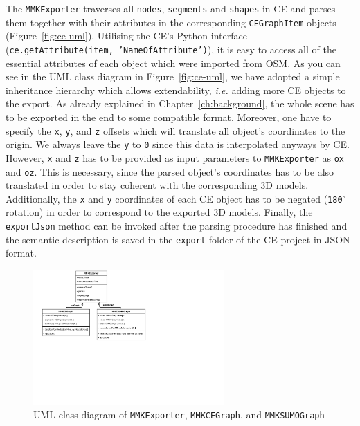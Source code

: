 The \texttt{MMKExporter} traverses all \texttt{nodes}, \texttt{segments} and \texttt{shapes} in CE and parses them together with their attributes in the corresponding \texttt{CEGraphItem} objects (Figure~\ref{fig:ce-uml}). Utilising the CE's Python interface (\texttt{ce.getAttribute(item, 'NameOfAttribute')}), it is easy to access all of the essential attributes of each object which were imported from OSM. As you can see in the UML class diagram in Figure~\ref{fig:ce-uml}, we have adopted a simple inheritance hierarchy which allows extendability, \emph{i.e.} adding more CE objects to the export. As already explained in Chapter~\ref{ch:background}, the whole scene has to be exported in the end to some compatible format. Moreover, one have to specify the \texttt{x}, \texttt{y}, and \texttt{z} offsets which will translate all object's coordinates to the origin. We always leave the \texttt{y} to \texttt{0} since this data is interpolated anyways by CE. However, \texttt{x} and \texttt{z} has to be provided as input parameters to \texttt{MMKExporter} as \texttt{ox} and \texttt{oz}. This is necessary, since the parsed object's coordinates has to be also translated in order to stay coherent with the corresponding 3D models. Additionally, the \texttt{x} and \texttt{y} coordinates of each CE object has to be negated (\texttt{180$^{\circ}$} rotation) in order to correspond to the exported 3D models. Finally, the \texttt{exportJson} method can be invoked after the parsing procedure has finished and the semantic description is saved in the \texttt{export} folder of the CE project in JSON format.

\begin{figure}[htb]
	\centering
	\includegraphics[width=0.65\textwidth]{figures/ce-overview-uml}
	\caption{UML class diagram of \texttt{MMKExporter}, \texttt{MMKCEGraph}, and  \texttt{MMKSUMOGraph}}
	\label{fig:ce-overview-uml}
\end{figure}

